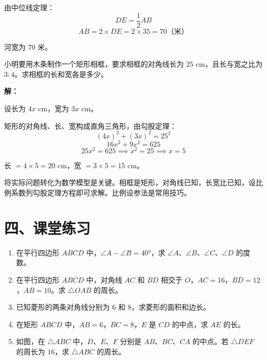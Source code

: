 \documentclass[12pt, a4paper]{ctexart}
\begin{document}
由中位线定理：
\[
DE = \frac{1}{2}AB
\]
\[
AB = 2 \times DE = 2 \times 35 = \boxed{70} \text{（米）}
\]

河宽为 $70$ 米。

\vspace{6pt}

\begin{appbox}
小明要用木条制作一个矩形相框，要求相框的对角线长为 $25$ cm，且长与宽之比为 $3:4$。求相框的长和宽各是多少。
\end{appbox}

\textbf{解：}

设长为 $4x$ cm，宽为 $3x$ cm。

矩形的对角线、长、宽构成直角三角形，由勾股定理：
\[
(4x)^2 + (3x)^2 = 25^2
\]
\[
16x^2 + 9x^2 = 625
\]
\[
25x^2 = 625 \implies x^2 = 25 \implies x = 5
\]

长 $= 4 \times 5 = 20$ cm，宽 $= 3 \times 5 = 15$ cm。

\begin{tipbox}[实际问题建模]
将实际问题转化为数学模型是关键。相框是矩形，对角线已知，长宽比已知，设比例系数列勾股定理方程即可求解。比例设参法是常用技巧。
\end{tipbox}

\section*{\textcolor{tipgreen}{四、课堂练习}}

\begin{enumerate}
  \item 在平行四边形 $ABCD$ 中，$\angle A - \angle B = 40°$，求 $\angle A$、$\angle B$、$\angle C$、$\angle D$ 的度数。

  \item 在平行四边形 $ABCD$ 中，对角线 $AC$ 和 $BD$ 相交于 $O$，$AC = 16$，$BD = 12$，$AB = 10$。求 $\triangle OAB$ 的周长。

  \item 已知菱形的两条对角线分别为 $6$ 和 $8$，求菱形的面积和边长。

  \item 在矩形 $ABCD$ 中，$AB = 6$，$BC = 8$，$E$ 是 $CD$ 的中点，求 $AE$ 的长。

  \item 如图，在 $\triangle ABC$ 中，$D$、$E$、$F$ 分别是 $AB$、$BC$、$CA$ 的中点。若 $\triangle DEF$ 的周长为 $16$，求 $\triangle ABC$ 的周长。
\end{enumerate}
\end{document}
